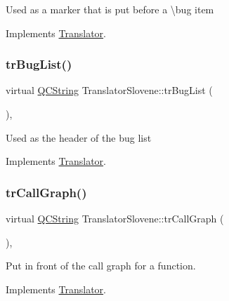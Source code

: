 Used as a marker that is put before a \textbackslash{}bug item 

Implements \mbox{\hyperlink{class_translator}{Translator}}.

\mbox{\label{class_translator_slovene_a9da501f9e0330e1d0c25eac47750da3b}} 
\subsubsection{\texorpdfstring{trBugList()}{trBugList()}}
{\footnotesize\ttfamily virtual \mbox{\hyperlink{class_q_c_string}{Q\+C\+String}} Translator\+Slovene\+::tr\+Bug\+List (\begin{DoxyParamCaption}{ }\end{DoxyParamCaption})\hspace{0.3cm}{\ttfamily [inline]}, {\ttfamily [virtual]}}

Used as the header of the bug list 

Implements \mbox{\hyperlink{class_translator}{Translator}}.

\mbox{\label{class_translator_slovene_a2ac7bc314de13a71dca04b10af9ebc75}} 
\subsubsection{\texorpdfstring{trCallGraph()}{trCallGraph()}}
{\footnotesize\ttfamily virtual \mbox{\hyperlink{class_q_c_string}{Q\+C\+String}} Translator\+Slovene\+::tr\+Call\+Graph (\begin{DoxyParamCaption}{ }\end{DoxyParamCaption})\hspace{0.3cm}{\ttfamily [inline]}, {\ttfamily [virtual]}}

Put in front of the call graph for a function. 

Implements \mbox{\hyperlink{class_translator}{Translator}}.

\mbox{\label{class_translator_slovene_aca83a7ce98fb83820789fd863622a564}} 
